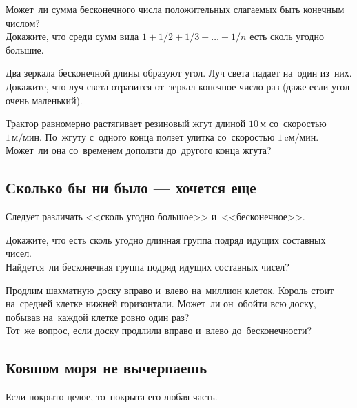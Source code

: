 \begin{problems}

\item
\sp
Может~ли сумма бесконечного числа положительных слагаемых быть конечным числом?
\\
\sp
Докажите, что среди сумм вида $1 + 1 / 2 + 1 / 3 + \ldots + 1 / n$ есть сколь
угодно большие.

\item
Два зеркала бесконечной длины образуют угол.
Луч света падает на~один из~них.
Докажите, что луч света отразится от~зеркал конечное число раз (даже если угол
очень маленький).

\item
Трактор равномерно растягивает резиновый жгут длиной $10\,\text{м}$
со~скоростью $1\,\text{м/мин}$.
По~жгуту с~одного конца ползет улитка со~скоростью $1\,\text{cм/мин}$.
Может~ли она со~временем доползти до~другого конца жгута?

\end{problems}

\subsection*{Сколько бы ни было --- хочется еще}

Следует различать <<сколь угодно большое>> и~<<бесконечное>>.

\begin{problems}

\item
\sp
Докажите, что есть сколь угодно длинная группа подряд идущих составных чисел.
\\
\sp
Найдется~ли бесконечная группа подряд идущих составных чисел?

\item
\sp
Продлим шахматную доску вправо и~влево на~миллион клеток.
Король стоит на~средней клетке нижней горизонтали.
Может~ли он~обойти всю доску, побывав на~каждой клетке ровно один раз?
\\
\sp
Тот~же вопрос, если доску продлили вправо и~влево до~бесконечности?

\end{problems}

\subsection*{Ковшом моря не вычерпаешь}

Если покрыто целое, то~покрыта его любая часть.

